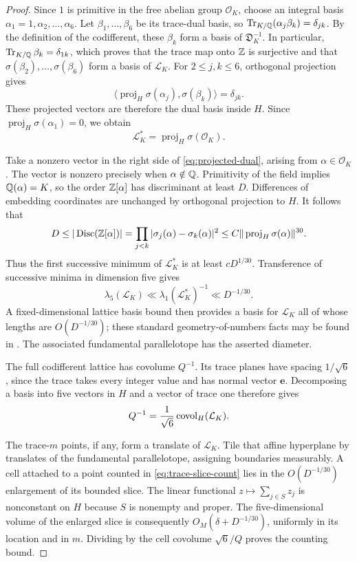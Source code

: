 \begin{proof}
Since $1$ is primitive in the free abelian group $\mathcal O_K$,
choose an integral basis $\alpha_1=1,\alpha_2,\ldots,\alpha_6$.
Let $\beta_1,\ldots,\beta_6$ be its trace-dual basis, so
$\operatorname{Tr}_{K/\mathbb Q}(\alpha_j\beta_k)=\delta_{jk}$.  By the definition of
the codifferent, these $\beta_k$ form a basis of
$\mathfrak D_K^{-1}$.  In particular,
$\operatorname{Tr}_{K/\mathbb Q}\beta_k=\delta_{1k}$, which proves that the trace map
onto $\mathbb Z$ is surjective and that
$\sigma(\beta_2),\ldots,\sigma(\beta_6)$ form a basis of
$\mathcal L_K$.  For $2\le j,k\le6$, orthogonal projection gives
\[
 \bigl\langle\operatorname{proj}_H\sigma(\alpha_j),
                    \sigma(\beta_k)\bigr\rangle=\delta_{jk}.
\]
These projected vectors are therefore the dual basis inside $H$.
Since $\operatorname{proj}_H\sigma(\alpha_1)=0$, we obtain
\begin{equation}
 \mathcal L_K^*=\operatorname{proj}_H\sigma(\mathcal O_K).
                                                        \label{eq:projected-dual}
\end{equation}

Take a nonzero vector in the right side of
\eqref{eq:projected-dual}, arising from $\alpha\in\mathcal O_K$.
The vector is nonzero precisely when $\alpha\notin\mathbb Q$.
Primitivity of the field implies $\mathbb Q(\alpha)=K$, so the order
$\mathbb Z[\alpha]$ has discriminant at least $D$.  Differences of
embedding coordinates are unchanged by orthogonal projection to
$H$.  It follows that
\[
 D\le |\operatorname{Disc}(\mathbb Z[\alpha])|
   =\prod_{j<k}|\sigma_j(\alpha)-\sigma_k(\alpha)|^2
   \le C\|\operatorname{proj}_H\sigma(\alpha)\|^{30}.
\]
Thus the first successive minimum of $\mathcal L_K^*$ is at least
$cD^{1/30}$.  Transference of successive minima in dimension five
gives
\[
 \lambda_5(\mathcal L_K)
       \ll\lambda_1(\mathcal L_K^*)^{-1}
       \ll D^{-1/30}.
\]
A fixed-dimensional lattice basis bound then provides a basis for
$\mathcal L_K$ all of whose lengths are $O(D^{-1/30})$; these
standard geometry-of-numbers facts may be found in \cite{Cassels1959}.
The associated fundamental parallelotope has the asserted diameter.

The full codifferent lattice has covolume $Q^{-1}$.  Its trace
planes have spacing $1/\sqrt6$, since the trace takes every integer
value and has normal vector $\mathbf e$.  Decomposing a basis into
five vectors in $H$ and a vector of trace one therefore gives
\[
 Q^{-1}=\frac1{\sqrt6}\operatorname{covol}_H(\mathcal L_K).
\]

The trace-$m$ points, if any, form a translate of $\mathcal L_K$.
Tile that affine hyperplane by translates of the fundamental
parallelotope, assigning boundaries measurably.  A cell attached to
a point counted in \eqref{eq:trace-slice-count} lies in the
$O(D^{-1/30})$ enlargement of its bounded slice.  The linear
functional $z\mapsto\sum_{j\in S}z_j$ is nonconstant on $H$ because
$S$ is nonempty and proper.  The five-dimensional volume of the
enlarged slice is consequently
$O_M(\delta+D^{-1/30})$, uniformly in its location and in $m$.
Dividing by the cell covolume $\sqrt6/Q$ proves the counting bound.
\end{proof}

